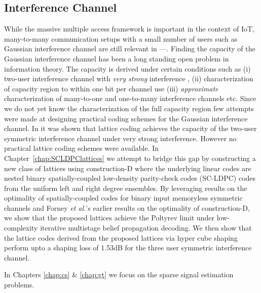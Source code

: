 \subsection*{Interference Channel}
While the massive multiple access framework is important in the context of IoT, many-to-many communication setups with a small number of users such as Gaussian interference channel are still relevant in ---.  Finding the capacity of the Gaussian interference channel has been a long standing open problem in information theory. The capacity is derived under certain conditions such as (i) two-user interference channel with \textit{very strong} interference \cite{carleial1978interference,sato1981capacity}, (ii) characterization of capacity region to within one bit per channel use \cite{etkin2008gaussian} (iii) \textit{approximate} characterization of many-to-one and one-to-many interference channels etc. Since we do not yet know the characterization of the full capacity region few attempts were made at designing practical coding schemes for the Gaussian interference channel. In \cite{sridharan2008capacity} it was shown that lattice coding achieves the capacity of the two-user symmetric interference channel under very strong interference. However no practical lattice coding schemes were available. In Chapter~\ref{chap:SCLDPClattices} we attempt to bridge this gap by constructing a new class of lattices using construction-D where the underlying linear codes are nested binary spatially-coupled low-density parity-check codes (SC-LDPC) codes from the uniform left and right degree ensembles. By leveraging results on the optimality of spatially-coupled codes for binary input memoryless symmetric channels and Forney {\em et al.}'s earlier results on the optimality of construction-D, we show that the proposed lattices achieve the Poltyrev limit under low-complexity iterative multistage belief propagation decoding. We then show that the lattice codes derived from the proposed lattices via hyper cube shaping perform upto a shaping loss of 1.53dB for the three user symmetric interference channel. 


In Chapters \ref{chap:cs} $\&$ \ref{chap:gt} we focus on the sparse signal estimation problems.
\vspace{-2pt}
